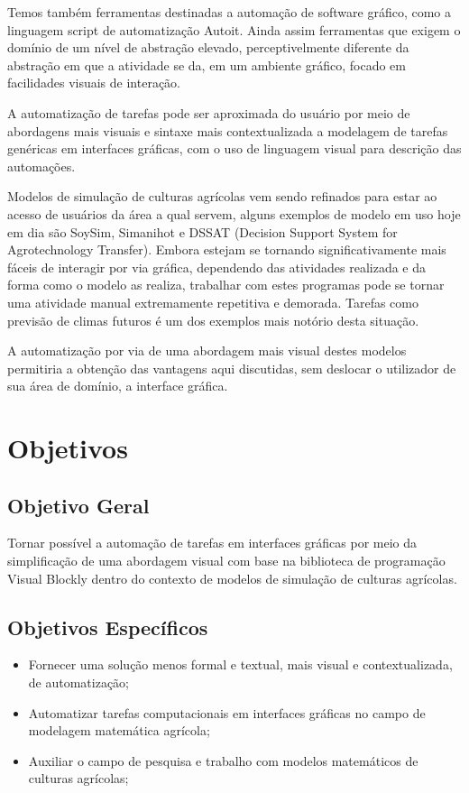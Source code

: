 \documentclass[12pt]{article}
\begin{document}
Temos também ferramentas destinadas a automação de software gráfico, como a linguagem script de automatização Autoit. Ainda assim ferramentas que exigem o domínio de um nível de abstração elevado, perceptivelmente diferente da abstração em que a atividade se da, em um ambiente gráfico, focado em facilidades visuais de interação.

A automatização de tarefas pode ser aproximada do usuário por meio de abordagens mais visuais e sintaxe mais contextualizada a modelagem de tarefas genéricas em interfaces gráficas, com o uso de linguagem visual para descrição das automações.

Modelos de simulação de culturas agrícolas vem sendo refinados para estar ao acesso de usuários da área a qual servem,  alguns exemplos de modelo em uso hoje em dia são SoySim, Simanihot e DSSAT (Decision Support System for Agrotechnology Transfer). Embora estejam se tornando significativamente mais fáceis de interagir por via gráfica, dependendo das atividades realizada e da forma como o modelo as realiza, trabalhar com estes programas pode se tornar uma atividade manual extremamente repetitiva e demorada. Tarefas como previsão de climas futuros é um dos exemplos mais notório desta situação.

A automatização por via de uma abordagem mais visual destes modelos permitiria a obtenção das vantagens aqui discutidas, sem deslocar o utilizador de sua área de domínio, a interface gráfica. 
	
	\section{Objetivos}
	
	\subsection{Objetivo Geral}
	
	Tornar possível a automação de tarefas em interfaces gráficas por meio da simplificação de uma abordagem visual com base na biblioteca de programação Visual Blockly dentro do contexto de modelos de simulação de culturas agrícolas.

	\subsection{Objetivos Específicos}
	
	\begin{itemize}
		\item Fornecer uma solução menos formal e textual, mais visual e contextualizada, de automatização;
		\item Automatizar tarefas computacionais em interfaces gráficas no campo de modelagem matemática agrícola;
		\item Auxiliar o campo de pesquisa e trabalho com modelos matemáticos de culturas agrícolas;
	\end{itemize}
	
\end{document}
